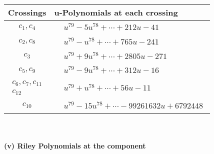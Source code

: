\documentclass[1p]{elsarticle_modified}
\theoremstyle{definition}
\begin{document}
\begin{tabular}{m{50pt}|m{274pt}}
Crossings & \hspace{64pt}u-Polynomials at each crossing \\
\hline $$\begin{aligned}c_{1},c_{4}\end{aligned}$$&$\begin{aligned}
&u^{79}-5 u^{78}+\cdots+212 u-41
\end{aligned}$\\
\hline $$\begin{aligned}c_{2},c_{8}\end{aligned}$$&$\begin{aligned}
&u^{79}- u^{78}+\cdots+765 u-241
\end{aligned}$\\
\hline $$\begin{aligned}c_{3}\end{aligned}$$&$\begin{aligned}
&u^{79}+9 u^{78}+\cdots+2805 u-271
\end{aligned}$\\
\hline $$\begin{aligned}c_{5},c_{9}\end{aligned}$$&$\begin{aligned}
&u^{79}-9 u^{78}+\cdots+312 u-16
\end{aligned}$\\
\hline $$\begin{aligned}c_{6},c_{7},c_{11}\\c_{12}\end{aligned}$$&$\begin{aligned}
&u^{79}+u^{78}+\cdots+56 u-11
\end{aligned}$\\
\hline $$\begin{aligned}c_{10}\end{aligned}$$&$\begin{aligned}
&u^{79}-15 u^{78}+\cdots-99261632 u+6792448
\end{aligned}$\\
\hline
\end{tabular}\\~\\
\newpage\renewcommand{\arraystretch}{1}
\flushleft \textbf{(v) Riley Polynomials at the component}\newline \\
\end{document}
